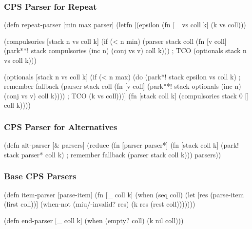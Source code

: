 \documentclass{beamer}
\begin{document}

\begin{frame}[fragile]
\frametitle{CPS Parser for Repeat}

{\scriptsize
\begin{semiverbatim}
(defn repeat-parser [min max parser]
  (letfn [(epsilon (fn [_ vs coll k] (k vs coll)))

          (compulsories [stack n vs coll k]
            (if (< n min)
              (parser stack coll
                      (fn [v coll]
                        (park**! stack compulsories
                                 (inc n) (conj vs v) coll k))) ; TCO
              (optionals stack n vs coll k)))

          (optionals [stack n vs coll k]
            (if (< n max)
              (do
                (park*! stack epsilon vs coll k) ; remember fallback
                (parser stack coll
                        (fn [v coll]
                          (park**! stack optionals
                                   (inc n) (conj vs v) coll k)))) ; TCO
              (k vs coll)))]
    (fn [stack coll k] (compulsories stack 0 [] coll k))))
\end{semiverbatim}
}

\end{frame}


\begin{frame}[fragile]
\frametitle{CPS Parser for Alternatives}

{\scriptsize
\begin{semiverbatim}
(defn alt-parser [& parsers]
  (reduce (fn [parser parser*]
            (fn [stack coll k]
              (park! stack parser* coll k) ; remember fallback
              (parser stack coll k)))
          parsers))
\end{semiverbatim}
}

\end{frame}


\begin{frame}[fragile]
\frametitle{Base CPS Parsers}

\begin{semiverbatim}
(defn item-parser [parse-item]
  (fn [_ coll k]
    (when (seq coll)
      (let [res (parse-item (first coll))]
        (when-not (miu/-invalid? res)
          (k res (rest coll)))))))
\end{semiverbatim}

\begin{semiverbatim}
(defn end-parser [_ coll k]
  (when (empty? coll)
    (k nil coll)))
\end{semiverbatim}

\end{frame}
\end{document}
